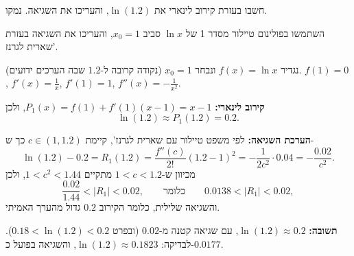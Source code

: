 
\begin{question}
חשבו בעזרת קירוב לינארי את $\ln(1.2)$, והעריכו את השגיאה. נמקו.
\end{question}

\begin{hint}
השתמשו בפולינום טיילור מסדר 1 של $\ln x$ סביב $x_0 = 1$, והעריכו את השגיאה בעזרת שארית לגרנז'.
\end{hint}

\begin{solution}
נגדיר $f(x) = \ln x$ ונבחר $x_0 = 1$ (נקודה קרובה ל-$1.2$ שבה הערכים ידועים). $f(1) = 0$, $f'(x) = \frac1x$, $f'(1) = 1$, $f''(x) = -\frac{1}{x^2}$.

\textbf{קירוב לינארי:} $P_1(x) = f(1) + f'(1)(x - 1) = x - 1$, ולכן
\[ \ln(1.2) \approx P_1(1.2) = 0.2. \]

\textbf{הערכת השגיאה:} לפי משפט טיילור עם שארית לגרנז', קיימת $c\in(1, 1.2)$ כך ש-
\[ \ln(1.2) - 0.2 = R_1(1.2) = \frac{f''(c)}{2!}(1.2 - 1)^2 = -\frac{1}{2c^2}\cdot 0.04 = -\frac{0.02}{c^2}. \]
מכיוון ש-$1 < c < 1.2$ מתקיים $1 < c^2 < 1.44$, ולכן
\[ \frac{0.02}{1.44} < |R_1| < 0.02, \qquad\text{כלומר}\qquad 0.0138 < |R_1| < 0.02, \]
והשגיאה שלילית, כלומר הקירוב $0.2$ גדול מהערך האמיתי.

\textbf{תשובה:} $\ln(1.2) \approx 0.2$, עם שגיאה קטנה מ-$0.02$ (ובפרט $0.18 < \ln(1.2) < 0.2$).
לבדיקה: $\ln(1.2) \approx 0.1823$, והשגיאה בפועל כ-$0.0177$.
\end{solution}
